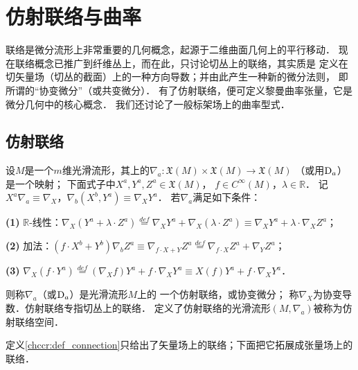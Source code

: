 
\chapter{仿射联络与曲率}\label{chccr}
联络是微分流形上非常重要的几何概念，起源于二维曲面几何上的平行移动．
现在联络概念已推广到纤维丛上，而在此，只讨论切丛上的联络，其实质是
定义在切矢量场（切丛的截面）上的一种方向导数；并由此产生一种新的微分法则，
即所谓的“协变微分”（或共变微分）．
有了仿射联络，便可定义黎曼曲率张量，它是微分几何中的核心概念．
我们还讨论了一般标架场上的曲率型式．



\section{仿射联络}\label{chccr:sec_affine-connection}

\begin{definition}\label{chccr:def_connection}
    设$M$是一个$m$维光滑流形，其上的$\nabla_a:\mathfrak{X}(M)\times \mathfrak{X}(M)\to \mathfrak{X}(M)$
    （或用${\rm D}_a$）是一个映射；
    下面式子中$ X^a, Y^a, Z^a\in \mathfrak{X}(M)$，
    $ f\in C^\infty(M)$，$ \lambda \in \mathbb{R}$．
    记$X^a\nabla_a \equiv \nabla_X $，$\nabla_b (X^b, Y^a) \equiv \nabla_X Y^a$．
    若$\nabla_a$满足如下条件：

    {\bfseries (1)}  $\mathbb{R}$-线性：$\nabla_X (Y^a +\lambda\cdot Z^a)
       \overset{def}{=}\nabla_X Y^a +\nabla_X (\lambda\cdot Z^a) \equiv  \nabla_X Y^a +\lambda\cdot\nabla_X Z^a$；

    {\bfseries (2)} 加法：$(f\cdot X^b+Y^b)\nabla_{b} Z^a \equiv \nabla_{f\cdot X+Y} Z^a
    \overset{def}{=} \nabla_{f\cdot X} Z^a + \nabla_{Y} Z^a $；

    {\bfseries (3)} $\nabla_{X} (f\cdot Y^a) \overset{def}{=} (\nabla_{X} f) Y^a + f\cdot \nabla_{X} Y^a
     \equiv X(f) Y^a + f\cdot \nabla_{X} Y^a$．

    则称$\nabla_a$（或${\rm D}_a$）是光滑流形$M$上的
    一个{\heiti 仿射联络}，或{\heiti 协变微分}；
    称$\nabla_X$为{\heiti 协变导数}．仿射联络专指切丛上的联络．
    定义了仿射联络的光滑流形$(M,\nabla_a)$被称为{\heiti 仿射联络空间}．
\end{definition}

定义\ref{chccr:def_connection}只给出了矢量场上的联络；下面把它拓展成张量场上的联络．

